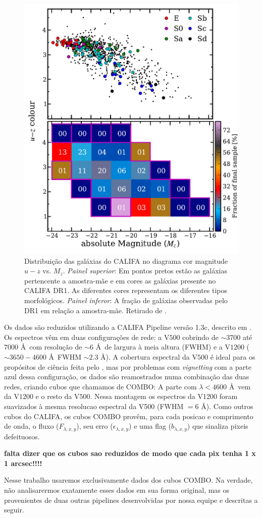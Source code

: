 \begin{figure}
    \includegraphics[height=0.5\textwidth]{figuras/figHusemann2013Fig2.pdf}
    \caption[Diagrama cor-magnitude para as galáxias do CALIFA.]
    {Distribui\c{c}\~ao das galáxias do CALIFA no diagrama cor magnitude $u-z$ vs. $M_z$. 
    {\em Painel superior}: Em pontos pretos est\~ao as galáxias pertencente a
    amostra-m\~ae e em cores as galáxias presente no CALIFA DR1. As diferentes
    cores representam os diferentes tipos morfológicos. {\em Painel inferor}: A
    fra\c{c}\~ao de galáxias observadas pelo DR1 em rela\c{c}\~ao a
    amostra-m\~ae. Retirado de \citet{Husemann2013}.}
    \label{fig:cm-uzMz}
\end{figure}

Os dados são reduzidos utilizando a CALIFA Pipeline versão 1.3c, descrito em \citet{Husemann2013}. Os espectros vêm em
duas configurações de rede: a V$500$ cobrindo de $\sim3700$ até $7000$ \AA\ com resolução de $\sim6$ \AA\ de largura à
meia altura (FWHM) e a V$1200$ ($\sim3650-4600$ \AA\  FWHM $\sim2.3$ \AA). A cobertura espectral da V$500$ é ideal para
os propósitos de ciência feita pelo \starlight, mas por problemas com {\em vignetting} com a parte azul dessa
configuração, os dados são reamostrados numa combinação das duas redes, criando cubos que chamamos de COMBO: A parte com
$\lambda < 4600$ \AA\  vem da V$1200$ e o resto da V$500$. Nessa montagem os espectros da V1200 foram suavizados à mesma
resolucao espectral da V500 (FWHM $= 6$ \AA).
Como outros cubos do CALIFA, os cubos COMBO provêm, para cada posicao e comprimento de onda,  o fluxo
($F_{\lambda,x,y}$), seu erro ($\epsilon_{\lambda,x,y}$) e uma flag ($b_{\lambda,x,y}$) que sinaliza pixeis defeituosos.


{\bf \ojo falta dizer que os cubos sao reduzidos de modo que cada pix tenha 1 x 1 arcsec!!!!}


Nesse trabalho usaremos exclusivamente dados dos cubos COMBO. Na verdade, não analisarermos exatamente esses dados em
sua forma original, mas os provenientes de duas outras pipelines desenvolvidas por nossa equipe e descritas a seguir.

